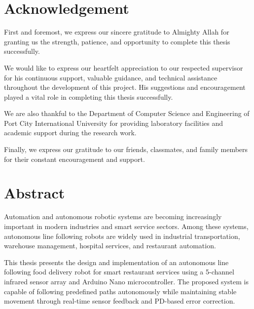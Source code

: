 \documentclass[12pt,a4paper,oneside]{report}
\begin{document}
\newpage


\chapter*{Acknowledgement}

First and foremost, we express our sincere gratitude to Almighty Allah for granting us the strength, patience, and opportunity to complete this thesis successfully.

We would like to express our heartfelt appreciation to our respected supervisor for his continuous support, valuable guidance, and technical assistance throughout the development of this project. His suggestions and encouragement played a vital role in completing this thesis successfully.

We are also thankful to the Department of Computer Science and Engineering of Port City International University for providing laboratory facilities and academic support during the research work.

Finally, we express our gratitude to our friends, classmates, and family members for their constant encouragement and support.

\newpage


\chapter*{Abstract}

Automation and autonomous robotic systems are becoming increasingly important in modern industries and smart service sectors. Among these systems, autonomous line following robots are widely used in industrial transportation, warehouse management, hospital services, and restaurant automation.

This thesis presents the design and implementation of an autonomous line following food delivery robot for smart restaurant services using a 5-channel infrared sensor array and Arduino Nano microcontroller. The proposed system is capable of following predefined paths autonomously while maintaining stable movement through real-time sensor feedback and PD-based error correction.
\end{document}
